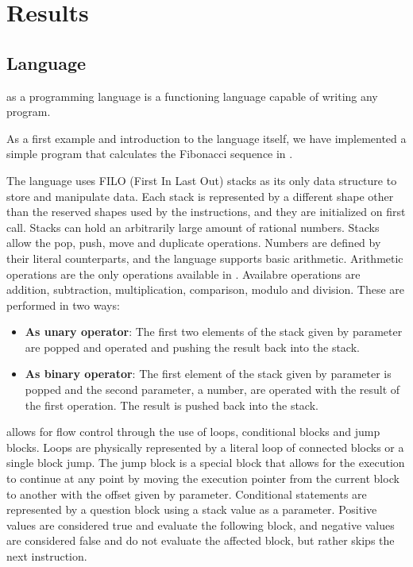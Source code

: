 
\section{Results}
\label{sec:results}

\subsection{Language}
\label{sec:results:language}

\sculpt as a programming language is a functioning language capable of writing any program.

As a first example and introduction to the language itself, we have implemented a simple program that calculates the Fibonacci sequence in \sculpt.

The language uses FILO (First In Last Out) stacks as its only data structure to store and manipulate data. Each stack is represented by a different shape other than the reserved shapes used by the instructions, and they are initialized on first call.
Stacks can hold an arbitrarily large amount of rational numbers.
Stacks allow the pop, push, move and duplicate operations.
Numbers are defined by their literal counterparts, and the language supports basic arithmetic.
Arithmetic operations are the only operations available in \sculpt.
Availabre operations are addition, subtraction, multiplication, comparison, modulo and division.
These are performed in two ways:

\begin{itemize}
    \item \textbf{As unary operator}: The first two elements of the stack given by parameter are popped and operated and pushing the result back into the stack.
    \item \textbf{As binary operator}: The first element of the stack given by parameter is popped and the second parameter, a number, are operated with the result of the first operation. The result is pushed back into the stack.
\end{itemize}

\sculpt allows for flow control through the use of loops, conditional blocks and jump blocks.
Loops are physically represented by a literal loop of connected blocks or a single block jump.
The jump block is a special block that allows for the execution to continue at any point by moving the execution pointer from the current block to another with the offset given by parameter.
Conditional statements are represented by a question block using a stack value as a parameter. Positive values are considered true and evaluate the following block, and negative values are considered false and do not evaluate the affected block, but rather skips the next instruction.


